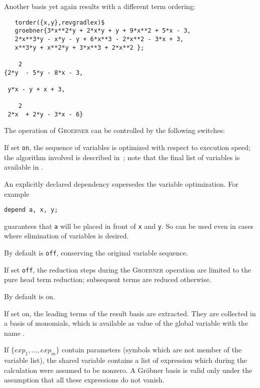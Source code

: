 Another basis yet again results with a different term ordering:
\begin{verbatim}
   torder({x,y},revgradlex)$
   groebner{3*x**2*y + 2*x*y + y + 9*x**2 + 5*x - 3,
   2*x**3*y - x*y - y + 6*x**3 - 2*x**2 - 3*x + 3,
   x**3*y + x**2*y + 3*x**3 + 2*x**2 };

    2
{2*y  - 5*y - 8*x - 3,

 y*x - y + x + 3,

    2
 2*x  + 2*y - 3*x - 6}
\end{verbatim}


The operation of \textsc{Groebner} can be controlled by the following switches:
\begin{description}
\item[\sw{groebopt} --]
  \hypertarget{switch:GROEBOPT}{}
If set \texttt{on}, the sequence of variables is optimized
with respect to execution speed; the algorithm involved is described
in~\cite{Boege:86}; note that the final list of variables is available in
.

An explicitly declared dependency supersedes the variable optimization. For example
\begin{center}
 \texttt{depend a, x, y;}
\end{center}
guarantees that \texttt{a} will be placed in front of \texttt{x} and \texttt{y}. So
 can be used even in cases where elimination of variables is desired.

By default  is \texttt{off}, conserving the original variable sequence.

\item[\sw{groebfullreduction} --]
  \hypertarget{switch:GROEBFULLREDUCTION}{}
If set \texttt{off}, the reduction steps during
the \linebreak[4] \textsc{Groebner} operation are limited to the pure head
term reduction; subsequent terms are reduced otherwise.

By default  is on.

\item[\sw{gltbasis} --]
\hypertarget{reserved:GLTB}{}
    \hypertarget{switch:GLTBASIS}{}
If set on, the leading terms of the result basis are
extracted. They are collected in a basis of monomials, which is
available as value of the global variable with the name .

\item[\sw{glterms} --]
  \hypertarget{switch:GLTERMS}{}
      \hypertarget{reserved:GLTERMS}{}
If $\{exp_1, \ldots , exp_m\} $ contain parameters
(symbols which are not member of the variable list), the shared variable
 contains a list of expression which during the
calculation were assumed to be nonzero. A Gr\"obner basis
is valid only under the assumption that all these expressions do not vanish.

\end{description}

